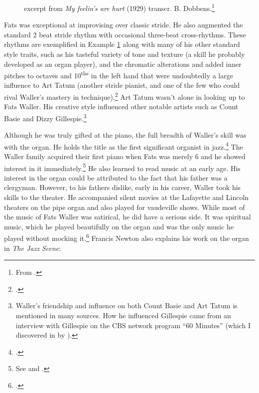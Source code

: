 \documentclass[11pt]{report}
\begin{document}
	
		\begin{figure}[ht]
			\centering
			\begin{minipage}{\textwidth}
				
				\caption{excerpt from \emph{My feelin's are hurt} (1929) transcr. B. Dobbens.\protect\footnote{\scriptsize From \cite[]{grove-book:waller}.}}
				\label{fig:hurt}
				

				{%
\parindent 0pt
\ifx\preLilyPondExample \undefined
\else
  \expandafter\preLilyPondExample
\fi
\def\lilypondbook{}%

\ifx\postLilyPondExample \undefined
\else
  \expandafter\postLilyPondExample
\fi
}


			\end{minipage}
		\end{figure}

	Fats was exceptional at improvising over classic stride. He also augmented the standard 2 beat stride rhythm with occasional three-beat cross-rhythms. These rhythms are exemplified in Example \ref{fig:hurt} along with many of his other standard style traits, such as his tasteful variety of tone and texture (a skill he probably developed as an organ player), and the chromatic alterations and added inner pitches to octaves and 10\textsuperscript{ths} in the left hand that were undoubtedly a large influence to Art Tatum (another stride pianist, and one of the few who could rival Waller's mastery in technique).\footnote{\cite[40]{grove-book:waller}.} Art Tatum wasn't alone in looking up to Fats Waller. His creative style influenced other notable artists such as Count Basie and Dizzy Gillespie.\footnote{Waller's friendship and influence on both Count Basie and Art Tatum is mentioned in many sources. How he influenced Gillespie came from an interview with Gillespie on the CBS network program ``60 Minutes'' (which I discovered in  by \cite{transcriptions}).}



	\label{sec:organ_and_classical}
	Although he was truly gifted at the piano, the full breadth of Waller's skill was with the organ. He holds the title as the first significant organist in jazz.\footnote{\cite[40]{grove-book:waller}.} The Waller family acquired their first piano when Fats was merely 6 and he showed interest in it immediately.\footnote{See \cite{transcriptions} and \cite{life}.} He also learned to read music at an early age. His interest in the organ could be attributed to the fact that his father was a clergyman. However, to his fathers dislike, early in his career, Waller took his skills to the theater. He accompanied silent movies at the Lafayette and Lincoln theaters on the pipe organ and also played for vaudeville shows. While most of the music of Fats Waller was satirical, he did have a serious side. It was spiritual music, which he played beautifully on the organ and was the only music he played without mocking it.\footnote{\cite[8]{outside-insider}.} Francis Newton also explains his work on the organ in \emph{The Jazz Scene}:
	
\end{document}
